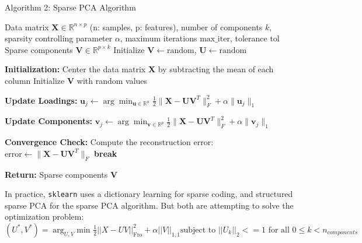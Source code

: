 \documentclass[12pt]{report} %
\begin{document}
\newpage

\begin{definitionbox}{Algorithm 2: Sparse PCA Algorithm}
  \begin{algorithmic}[1]
    \State Data matrix $\mathbf{X} \in \mathbb{R}^{n \times p}$ (n: samples, p: features), number of components $k$, sparsity controlling parameter $\alpha$, maximum iterations $\text{max\_iter}$, tolerance $\text{tol}$ 
    \State Sparse components $\mathbf{V} \in \mathbb{R}^{p \times k}$ 
    \State Initialize $\mathbf{V} \gets \text{random}$, $\mathbf{U} \gets \text{random}$ 

    \State \textbf{Initialization:}
    \State Center the data matrix $\mathbf{X}$ by subtracting the mean of each column
    \State Initialize $\mathbf{V}$ with random values

     
      \State \textbf{Update Loadings:}
       
        \State $\mathbf{u}_j \gets \arg \min_{\mathbf{u} \in \mathbb{R}^n} \frac{1}{2} \|\mathbf{X} - \mathbf{U} \mathbf{V}^T\|_F^2 + \alpha \|\mathbf{u}_j\|_1$
      \EndFor

      \State \textbf{Update Components:}
       
        \State $\mathbf{v}_j \gets \arg \min_{\mathbf{v} \in \mathbb{R}^p} \frac{1}{2} \|\mathbf{X} - \mathbf{U} \mathbf{V}^T\|_F^2 + \alpha \|\mathbf{v}_j\|_1$
      \EndFor

      \State \textbf{Convergence Check:}
      \State Compute the reconstruction error: $\text{error} \gets \|\mathbf{X} - \mathbf{U} \mathbf{V}^T\|_F$
        \State \textbf{break}
      \EndIf
    \EndFor

    \State \textbf{Return:} Sparse components $\mathbf{V}$

  \end{algorithmic}
  In practice, \texttt{sklearn} uses a dictionary learning for sparse coding\cite{mairal2010online}, and structured sparse PCA\cite{jenatton2010structured} for the sparse PCA algorithm. But both are attempting to solve the optimization problem: $(U^*, V^*) = \arg_{U, V} \text{min } \frac{1}{2} ||X-UV||_{\text{Fro}}^2+\alpha||V||_{1,1} \text{subject to } ||U_k||_2 <= 1 \text{ for all } 0 \leq k < n_{components}$
  \label{alg:SPCA}
\end{definitionbox}
\end{document}
